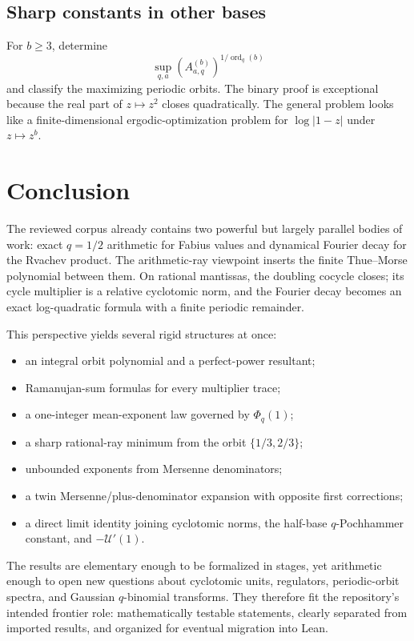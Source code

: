 \documentclass[11pt,oneside]{article}
\theoremstyle{definition}
\theoremstyle{remark}
\newcommand{\ord}{\operatorname{ord}}
\begin{document}
\subsection{Sharp constants in other bases}

For $b\ge3$, determine
\[
 \sup_{q,a}\left(A_{a,q}^{(b)}\right)^{1/\ord_q(b)}
\]
and classify the maximizing periodic orbits. The binary proof is exceptional
because the real part of $z\mapsto z^2$ closes quadratically. The general problem
looks like a finite-dimensional ergodic-optimization problem for
$\log|1-z|$ under $z\mapsto z^b$.

\section{Conclusion}\label{sec:conclusion}

The reviewed corpus already contains two powerful but largely parallel bodies of
work: exact $q=1/2$ arithmetic for Fabius values and dynamical Fourier decay for the
Rvachev product. The arithmetic-ray viewpoint inserts the finite Thue--Morse
polynomial between them. On rational mantissas, the doubling cocycle closes; its
cycle multiplier is a relative cyclotomic norm, and the Fourier decay becomes an
exact log-quadratic formula with a finite periodic remainder.

This perspective yields several rigid structures at once:
\begin{itemize}
 \item an integral orbit polynomial and a perfect-power resultant;
 \item Ramanujan-sum formulas for every multiplier trace;
 \item a one-integer mean-exponent law governed by $\Phi_q(1)$;
 \item a sharp rational-ray minimum from the orbit $\{1/3,2/3\}$;
 \item unbounded exponents from Mersenne denominators;
 \item a twin Mersenne/plus-denominator expansion with opposite first corrections;
 \item a direct limit identity joining cyclotomic norms, the half-base
 $q$-Pochhammer constant, and $-\mathscr U'(1)$.
\end{itemize}
The results are elementary enough to be formalized in stages, yet arithmetic enough
to open new questions about cyclotomic units, regulators, periodic-orbit spectra,
and Gaussian $q$-binomial transforms. They therefore fit the repository's intended
frontier role: mathematically testable statements, clearly separated from imported
results, and organized for eventual migration into Lean.
\end{document}
